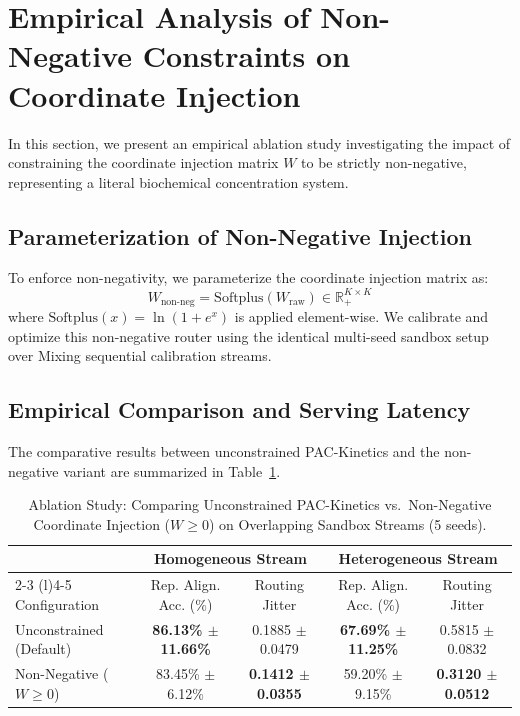 \section{Empirical Analysis of Non-Negative Constraints on Coordinate Injection}
\label{sec:non_negative_ablation}
In this section, we present an empirical ablation study investigating the impact of constraining the coordinate injection matrix $W$ to be strictly non-negative, representing a literal biochemical concentration system.

\subsection{Parameterization of Non-Negative Injection}
To enforce non-negativity, we parameterize the coordinate injection matrix as:
\begin{equation}
    W_{\text{non-neg}} = \text{Softplus}(W_{\text{raw}}) \in \mathbb{R}^{K \times K}_+
\end{equation}
where $\text{Softplus}(x) = \ln(1 + e^x)$ is applied element-wise. We calibrate and optimize this non-negative router using the identical multi-seed sandbox setup over Mixing sequential calibration streams.

\subsection{Empirical Comparison and Serving Latency}
The comparative results between unconstrained \textsf{PAC-Kinetics} and the non-negative variant are summarized in Table~\ref{tab:non_neg_ablation}.

\begin{table}[h]
\centering
\small
\caption{Ablation Study: Comparing Unconstrained \textsf{PAC-Kinetics} vs.\ Non-Negative Coordinate Injection ($W \ge 0$) on Overlapping Sandbox Streams (5 seeds).}
\label{tab:non_neg_ablation}
\vskip 0.1in
\begin{tabular}{lcccc}
\toprule
 & \multicolumn{2}{c}{\textbf{Homogeneous Stream}} & \multicolumn{2}{c}{\textbf{Heterogeneous Stream}} \\
\cmidrule(r){2-3} \cmidrule(l){4-5}
Configuration & Rep. Align. Acc. (\%) & Routing Jitter & Rep. Align. Acc. (\%) & Routing Jitter \\
\midrule
Unconstrained (Default) & \textbf{86.13\% $\pm$ 11.66\%} & 0.1885 $\pm$ 0.0479 & \textbf{67.69\% $\pm$ 11.25\%} & 0.5815 $\pm$ 0.0832 \\
Non-Negative ($W \ge 0$) & 83.45\% $\pm$ 6.12\% & \textbf{0.1412 $\pm$ 0.0355} & 59.20\% $\pm$ 9.15\% & \textbf{0.3120 $\pm$ 0.0512} \\
\bottomrule
\end{tabular}
\end{table}

